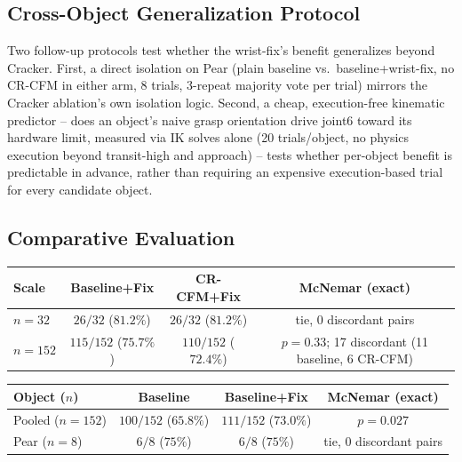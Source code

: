 \documentclass[]{interact}
\begin{document}
\subsection{Cross-Object Generalization Protocol}
Two follow-up protocols test whether the wrist-fix's benefit generalizes beyond Cracker. First, a
direct isolation on Pear (plain baseline vs.\ baseline+wrist-fix, no CR-CFM in either arm, 8 trials,
3-repeat majority vote per trial) mirrors the Cracker ablation's own isolation logic. Second, a
cheap, execution-free kinematic predictor -- does an object's naive grasp orientation drive joint6
toward its hardware limit, measured via IK solves alone (20 trials/object, no physics execution
beyond transit-high and approach) -- tests whether per-object benefit is predictable in advance,
rather than requiring an expensive execution-based trial for every candidate object.

\subsection{Comparative Evaluation}

\begin{table}[ht]
{\begin{tabular}{lccc} \toprule
Scale & Baseline+Fix & CR-CFM+Fix & McNemar (exact) \\ \midrule
$n=32$  & $26/32$ ($81.2\%$)  & $26/32$ ($81.2\%$)  & tie, 0 discordant pairs \\
$n=152$ & $115/152$ ($75.7\%$) & $110/152$ ($72.4\%$) & $p=0.33$; 17 discordant (11 baseline, 6 CR-CFM) \\
\bottomrule
\end{tabular}}
\label{tab:critical_ablation}
\end{table}

\begin{table}[ht]
{\begin{tabular}{lccc} \toprule
Object ($n$) & Baseline & Baseline+Fix & McNemar (exact) \\ \midrule
Pooled ($n=152$) & $100/152$ ($65.8\%$) & $111/152$ ($73.0\%$) & $p=0.027$ \\
Pear ($n=8$)     & $6/8$ ($75\%$)       & $6/8$ ($75\%$)       & tie, 0 discordant pairs \\
\bottomrule
\end{tabular}}
\label{tab:wristfix_effect}
\end{table}
\end{document}
